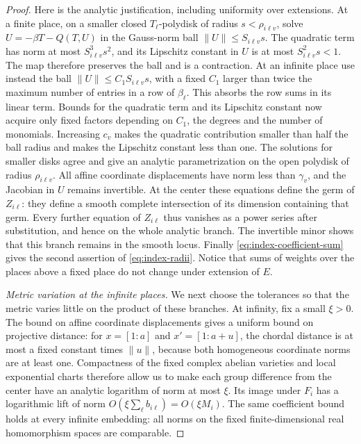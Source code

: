 \begin{proof}
Here is the analytic justification, including uniformity over
extensions.  At a finite place, on a smaller closed $T_\ell$-polydisk
of radius $s<\rho_{i\ell v}$, solve
$U=-\beta T-Q(T,U)$ in the Gauss-norm ball $\|U\|\le S_{i\ell v}s$.
The quadratic term has norm at most $S_{i\ell v}^3s^2$, and its
Lipschitz constant in $U$ is at most $S_{i\ell v}^2s<1$.
The map therefore preserves the ball and is a contraction.
At an infinite place use instead the ball
$\|U\|\le C_1S_{i\ell v}s$, with a fixed $C_1$ larger than twice the
maximum number of entries in a row of $\beta_\ell$. This absorbs the
row sums in its linear term. Bounds for the quadratic term and its
Lipschitz constant now acquire only fixed factors depending on $C_1$,
the degrees and the number of monomials. Increasing $c_v$ makes the
quadratic contribution smaller than half the ball radius and makes the
Lipschitz constant less than one.  The solutions for smaller disks agree and give an
analytic parametrization on the open polydisk of radius
$\rho_{i\ell v}$.  All affine coordinate displacements have norm
less than $\gamma_v$, and the Jacobian in $U$ remains invertible.
At the center these equations define the germ of $Z_{i\ell}$:
they define a smooth complete intersection of its dimension containing
that germ.  Every further equation of $Z_{i\ell}$ thus vanishes as
a power series after substitution, and hence on the whole analytic
branch.  The invertible minor shows that this branch remains in the
smooth locus.  Finally \eqref{eq:index-coefficient-sum} gives the
second assertion of \eqref{eq:index-radii}.  Notice that sums of
weights over the places above a fixed place do not change under
extension of $E$.

\emph{Metric variation at the infinite places.}
We next choose the tolerances so that the metric varies little on the
product of these branches.  At infinity, fix a small $\xi>0$.
The bound on affine coordinate displacements gives a uniform bound
on projective distance: for $x=[1:a]$ and $x'=[1:a+u]$, the chordal
distance is at most a fixed constant times $\|u\|$, because both
homogeneous coordinate norms are at least one. Compactness of the fixed
complex abelian varieties and local exponential charts therefore allow
us to make each group difference from the center have an analytic
logarithm of norm at most $\xi$.  Its image
under $F_i$ has a logarithmic lift of norm
$O(\xi\sum_\ell b_{i\ell})=O(\xi M_i)$.  The same coefficient
bound holds at every infinite embedding: all norms on the fixed
finite-dimensional real homomorphism spaces are comparable.


\end{proof}
